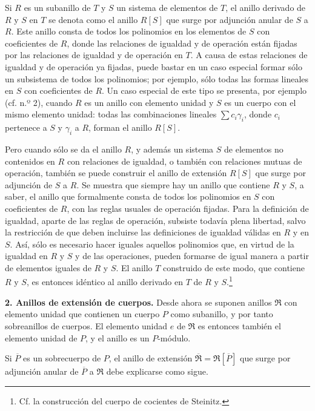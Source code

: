 \documentclass[11pt]{article}
\begin{document}
Si $R$ es un subanillo de $T$ y $S$ un sistema de elementos de $T$, el anillo derivado de $R$ y $S$ en $T$ se denota como el anillo $R[S]$ que surge por adjunción anular de $S$ a $R$. Este anillo consta de todos los polinomios en los elementos de $S$ con coeficientes de $R$, donde las relaciones de igualdad y de operación están fijadas por las relaciones de igualdad y de operación en $T$. A causa de estas relaciones de igualdad y de operación ya fijadas, puede bastar en un caso especial formar sólo un subsistema de todos los polinomios; por ejemplo, sólo todas las formas lineales en $S$ con coeficientes de $R$. Un caso especial de este tipo se presenta, por ejemplo (cf. n.º 2), cuando $R$ es un anillo con elemento unidad y $S$ es un cuerpo con el mismo elemento unidad: todas las combinaciones lineales $\sum c_i\gamma_i$, donde $c_i$ pertenece a $S$ y $\gamma_i$ a $R$, forman el anillo $R[S]$.

Pero cuando sólo se da el anillo $R$, y además un sistema $S$ de elementos no contenidos en $R$ con relaciones de igualdad, o también con relaciones mutuas de operación, también se puede construir el anillo de extensión $R[S]$ que surge por adjunción de $S$ a $R$. Se muestra que siempre hay un anillo que contiene $R$ y $S$, a saber, el anillo que formalmente consta de todos los polinomios en $S$ con coeficientes de $R$, con las reglas usuales de operación fijadas. Para la definición de igualdad, aparte de las reglas de operación, subsiste todavía plena libertad, salvo la restricción de que deben incluirse las definiciones de igualdad válidas en $R$ y en $S$. Así, sólo es necesario hacer iguales aquellos polinomios que, en virtud de la igualdad en $R$ y $S$ y de las operaciones, pueden formarse de igual manera a partir de elementos iguales de $R$ y $S$. El anillo $T$ construido de este modo, que contiene $R$ y $S$, es entonces idéntico al anillo derivado en $T$ de $R$ y $S$.\footnote{Cf. la construcción del cuerpo de cocientes de Steinitz.}

\textbf{2. Anillos de extensión de cuerpos.} Desde ahora se suponen anillos $\mathfrak R$ con elemento unidad que contienen un cuerpo $P$ como subanillo, y por tanto sobreanillos de cuerpos. El elemento unidad $e$ de $\mathfrak R$ es entonces también el elemento unidad de $P$, y el anillo es un $P$-módulo.

Si $\overline P$ es un sobrecuerpo de $P$, el anillo de extensión $\overline{\mathfrak R}=\mathfrak R[\overline P]$ que surge por adjunción anular de $\overline P$ a $\mathfrak R$ debe explicarse como sigue.
\end{document}
